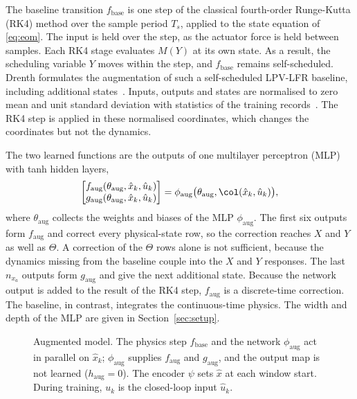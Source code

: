 The baseline transition $f_{\mathrm{base}}$ is one step of the classical
fourth-order Runge-Kutta (RK4) method over the sample period $T_s$, applied
to the state equation of \eqref{eq:eom}.
The input is held over the step, as the actuator force is held between
samples.
Each RK4 stage evaluates $M(Y)$ at its own state.
As a result, the scheduling variable $Y$ moves within the step, and
$f_{\mathrm{base}}$ remains self-scheduled.
Drenth formulates the augmentation of such a self-scheduled LPV-LFR
baseline, including additional states~\cite[Sec.~5.2]{drenth2025thesis}.
Inputs, outputs and states are normalised to zero mean and unit standard
deviation with statistics of the training
records~\cite[Sec.~5.3]{hoekstra2026lfr}.
The RK4 step is applied in these normalised coordinates, which changes the
coordinates but not the dynamics.

The two learned functions are the outputs of one multilayer perceptron (MLP)
with tanh hidden layers,
\begin{equation}
 \begin{bmatrix}
  f_{\mathrm{aug}}(\theta_{\mathrm{aug}},\hat x_k,\hat u_k)\\
  g_{\mathrm{aug}}(\theta_{\mathrm{aug}},\hat x_k,\hat u_k)
 \end{bmatrix}
 =\phi_{\mathrm{aug}}\bigl(\theta_{\mathrm{aug}},\col(\hat x_k,\hat u_k)\bigr),
 \label{eq:aug_mlp}
\end{equation}
where $\theta_{\mathrm{aug}}$ collects the weights and biases of the MLP
$\phi_{\mathrm{aug}}$.
The first six outputs form $f_{\mathrm{aug}}$ and correct every
physical-state row, so the correction reaches $X$ and $Y$ as well as
$\Theta$.
A correction of the $\Theta$ rows alone is not sufficient, because the
dynamics missing from the baseline couple into the $X$ and $Y$ responses.
The last $n_{x_a}$ outputs form $g_{\mathrm{aug}}$ and give the next
additional state.
Because the network output is added to the result of the RK4 step,
$f_{\mathrm{aug}}$ is a discrete-time correction.
The baseline, in contrast, integrates the continuous-time physics.
The width and depth of the MLP are given in Section~\ref{sec:setup}.

\begin{figure}[t]
 \centering
 \resizebox{\columnwidth}{!}{}
 \caption{Augmented model. The physics step $f_{\mathrm{base}}$ and the
 network $\phi_{\mathrm{aug}}$ act in parallel on $\hat x_k$;
 $\phi_{\mathrm{aug}}$ supplies $f_{\mathrm{aug}}$ and $g_{\mathrm{aug}}$,
 and the output map is not learned ($h_{\mathrm{aug}}=0$). The encoder
 $\psi$ sets $\hat x$ at each window start. During training, $u_k$ is the
 closed-loop input $\hat u_k$.}
 \label{fig:aug_structure}
\end{figure}

